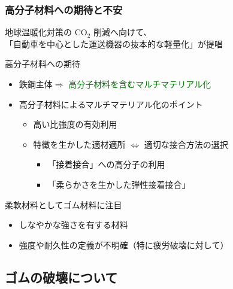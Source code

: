 \documentclass[aspectratio=169,11pt, dvipdfmx]{beamer}
\begin{document}
\begin{frame}
	\frametitle{高分子材料への期待と不安}
	地球温暖化対策の CO$_2$ 削減へ向けて、\\
	「自動車を中心とした運送機器の抜本的な軽量化」が提唱
	\begin{block}{高分子材料への期待}
		\begin{itemize}
			\item 鉄鋼主体$ \Rightarrow$ \textcolor{green}{高分子材料を含むマルチマテリアル化}
			\item 高分子材料によるマルチマテリアル化のポイント
				\begin{itemize}
					\item \alert{高い比強度}の有効利用
					\item 特徴を生かした適材適所 $\Leftrightarrow$ 適切な接合方法の選択
						\begin{itemize}
							\item {\color{red} 「接着接合」}への高分子の利用
							\item {\color{red} 「柔らかさを生かした弾性接着接合」}
						\end{itemize}
				\end{itemize}
		\end{itemize}
	\end{block}
	\begin{alertblock}{柔軟材料としてゴム材料に注目}
		\begin{itemize}
			\item しなやかな強さを有する材料
			\item {\color{blue}強度や耐久性の定義が不明確（特に疲労破壊に対して）}
		\end{itemize}
	\end{alertblock}
\end{frame}

\subsection{ゴムの破壊について}
\end{document}
